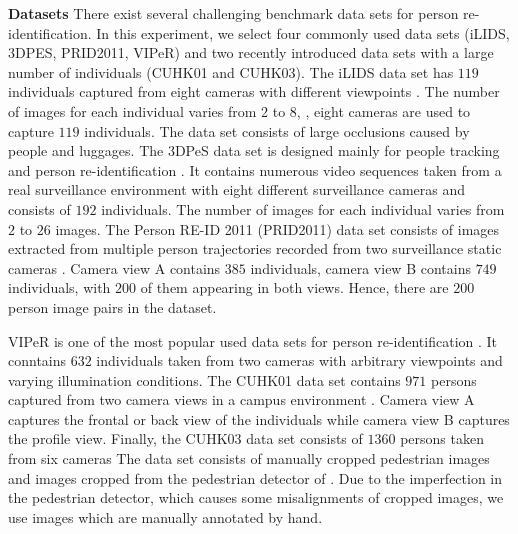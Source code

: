\documentclass[10pt,twocolumn,letterpaper]{article}
\renewcommand{\paragraph}{\textbf}
\begin{document}
\paragraph{Datasets}
%
There exist several challenging benchmark data sets for person re-identification.
In this experiment, we select four commonly used data sets
(iLIDS, 3DPES, PRID2011, VIPeR)
and two recently introduced data sets with a large number of individuals
(CUHK01 and CUHK03).
The iLIDS data set has $119$ individuals captured from eight cameras with
different viewpoints \cite{Zheng2009Associating}.
The number of images for each individual
varies from $2$ to $8$, \ie, eight cameras are used to capture $119$ individuals.
The data set consists of large occlusions caused by people and luggages.
The 3DPeS data set is designed mainly for people tracking
and person re-identification \cite{Baltieri20113dpes}.
It contains numerous video sequences taken from a real surveillance environment
with eight different surveillance cameras and
consists of $192$ individuals.
The number of images for each individual varies from $2$ to $26$ images.
The Person RE-ID 2011 (PRID2011) data set consists of images extracted
from multiple person trajectories recorded from two surveillance
static cameras \cite{Hirzer2011Person}.
Camera view A contains $385$ individuals, camera view B contains $749$ individuals,
with $200$ of them appearing in both views.
Hence, there are $200$ person image pairs in the dataset.



VIPeR is one of the most popular used data sets for
person re-identification \cite{Gray2007Evaluating}.
It conntains $632$ individuals taken from two cameras with
arbitrary viewpoints and varying illumination conditions.
%
The CUHK01 data set contains $971$ persons captured from two camera views in a campus
environment \cite{Li2012Human}.
Camera view A captures the frontal or back view of the individuals while
camera view B captures the profile view.
Finally, the CUHK03 data set consists of $1360$ persons taken from six cameras \cite{Li2014Deep}
The data set consists of manually cropped pedestrian images and
images cropped from the pedestrian detector of \cite{Felzenszwalb2010Object}.
Due to the imperfection in the pedestrian detector, which
causes some misalignments of cropped images,
we use images which are manually annotated by hand.
\end{document}
